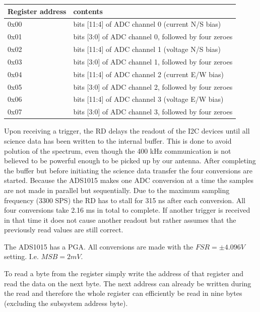 \documentclass[a4paper,indent]{paper}
\begin{document}
\begin{center}
  \begin{tabular}{|l|l|}
    \hline
    Register address & contents \\
    \hline
    0x00 & bits [11:4] of ADC channel 0 (current N/S bias)\\
    0x01 & bits [3:0]  of ADC channel 0, followed by four zeroes\\
    0x02 & bits [11:4] of ADC channel 1 (voltage N/S bias)\\
    0x03 & bits [3:0]  of ADC channel 1, followed by four zeroes \\
    0x04 & bits [11:4] of ADC channel 2 (current E/W bias)\\
    0x05 & bits [3:0]  of ADC channel 2, followed by four zeroes \\
    0x06 & bits [11:4] of ADC channel 3 (voltage E/W bias)\\
    0x07 & bits [3:0]  of ADC channel 3, followed by four zeroes \\
    \hline
  \end{tabular}
\end{center}

Upon receiving a trigger, the RD delays the readout of the I2C devices until all science data has been written to the internal buffer. This is done to avoid polution of the spectrum, even though the 400 kHz communication is not believed to be powerful enough to be picked up by our antenna. After completing the buffer but before initiating the science data transfer the four conversions are started. Because the ADS1015 makes one ADC conversion at a time the samples are not made in parallel but sequentially. Due to the maximum sampling frequency (3300 SPS) the RD has to stall for 315 ns after each conversion. 
All four conversions take 2.16 ms in total to complete. If another trigger is received in that time it does not cause another readout but rather assumes that the previously read values are still correct.

The ADS1015 has a PGA. All conversions are made with the $FSR=\pm4.096 V$ setting. I.e. $MSB = 2 mV$.

To read a byte from the register simply write the address of that register and read the data on the next byte. The next address can already be written during the read and therefore the whole register can efficiently be read in nine bytes (excluding the subsystem address byte).
\end{document}
